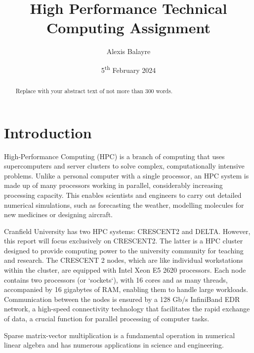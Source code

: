 \documentclass[12pt,oneside]{book} %
\title{High Performance Technical Computing Assignment}
\author{Alexis Balayre}
\date{5\textsuperscript{th} February 2024}
\begin{document}
\frontmatter

\maketitle

\begin{abstract}
    Replace with your abstract text of not more than 300 words.
\end{abstract}

{
\clearpage
\singlespacing
{
    \tableofcontents
}
\clearpage

\listoffigures

\listoftables
}

\mainmatter
\pagestyle{fancy}
\fancyhead[L]{\nouppercase{\leftmark}}
\fancyhead[R]{\nouppercase{\rightmark}}

\chapter{Introduction}
High-Performance Computing (HPC) is a branch of computing that uses
supercomputers and server clusters to solve complex, computationally intensive
problems. Unlike a personal computer with a single processor, an HPC system is
made up of many processors working in parallel, considerably increasing
processing capacity. This enables scientists and engineers to carry out
detailed numerical simulations, such as forecasting the weather, modelling
molecules for new medicines or designing aircraft.

Cranfield University has two HPC systems: CRESCENT2 and DELTA. However, this
report will focus exclusively on CRESCENT2. The latter is a HPC cluster
designed to provide computing power to the university community for teaching
and research. The CRESCENT 2 nodes, which are like individual workstations
within the cluster, are equipped with Intel Xeon E5 2620 processors. Each node
contains two processors (or `sockets`), with 16 cores and as many threads,
accompanied by 16 gigabytes of RAM, enabling them to handle large workloads.
Communication between the nodes is ensured by a 128 Gb/s InfiniBand EDR
network, a high-speed connectivity technology that facilitates the rapid
exchange of data, a crucial function for parallel processing of computer tasks.

Sparse matrix-vector multiplication is a fundamental operation in numerical
linear algebra and has numerous applications in science and engineering.
\end{document}

